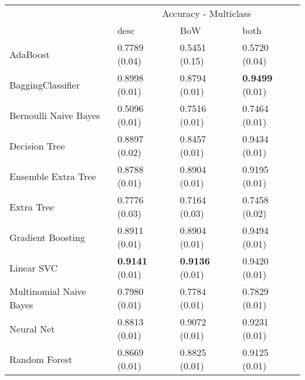 \begin{tabular}{|l|l|l|l| }
\hline
 &  \multicolumn{3}{c|}{ Accuracy - Multiclass} \\
\cline{2-4} & desc & BoW & both \\ \hline
AdaBoost                & 0.7789 (0.04) & 0.5451 (0.15) & 0.5720 (0.04)\\
BaggingClassifier       & 0.8998 (0.01) & 0.8794 (0.01) & {\bf 0.9499} (0.01)\\
Bernoulli Naive Bayes   & 0.5096 (0.01) & 0.7516 (0.01) & 0.7464 (0.01)\\
Decision Tree           & 0.8897 (0.02) & 0.8457 (0.01) & 0.9434 (0.01)\\
Ensemble Extra Tree     & 0.8788 (0.01) & 0.8904 (0.01) & 0.9195 (0.01)\\
Extra Tree              & 0.7776 (0.03) & 0.7164 (0.03) & 0.7458 (0.02)\\
Gradient Boosting       & 0.8911 (0.01) & 0.8904 (0.01) & 0.9494 (0.01)\\
Linear SVC              & {\bf 0.9141} (0.01) & {\bf 0.9136} (0.01) & 0.9420 (0.01)\\
Multinomial Naive Bayes & 0.7980 (0.01) & 0.7784 (0.01) & 0.7829 (0.01)\\
Neural Net              & 0.8813 (0.01) & 0.9072 (0.01) & 0.9231 (0.01)\\
Random Forest           & 0.8669 (0.01) & 0.8825 (0.01) & 0.9125 (0.01)\\
\hline
\end{tabular}